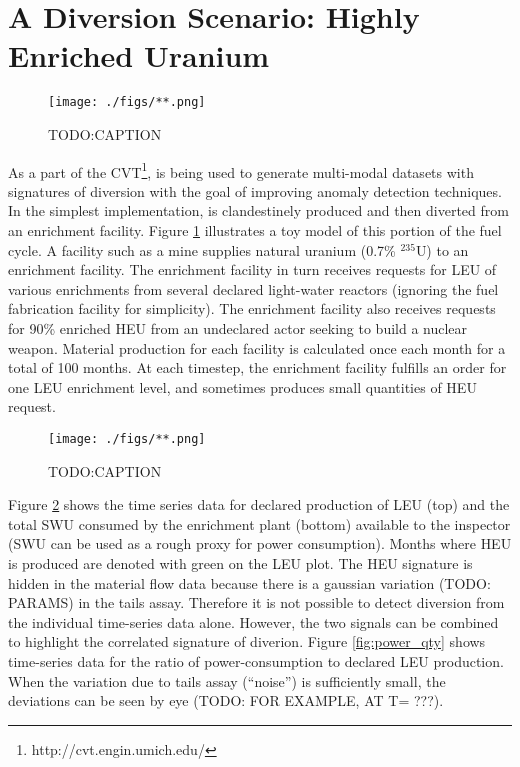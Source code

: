 \section{A Diversion Scenario: Highly Enriched Uranium}
\label{s_results}



\begin{figure}%
\begin{center}
\texttt{[image: ./figs/**.png]}
\end{center}
\caption{TODO:CAPTION}
\label{fig:scenario_layout}
\end{figure}


As a part of the \gls{CVT}\footnote{http://cvt.engin.umich.edu/}, \Cyclus is being used to generate multi-modal datasets with signatures of diversion with the goal of improving anomaly detection techniques. In the simplest implementation,  is clandestinely produced and then diverted from an enrichment facility.  Figure \ref{fig:scenario_layout} illustrates a toy model of this portion of the fuel cycle. A facility such as a mine supplies natural uranium (0.7\% $^{235}$U) to an enrichment facility. The enrichment facility in turn receives requests for \gls{LEU} of various enrichments from several declared light-water reactors (ignoring the fuel fabrication facility for simplicity).  The enrichment facility also receives requests for 90\% enriched \gls{HEU} from an undeclared actor seeking to build a nuclear weapon. Material production for each facility is calculated once each month for a total of 100 months. At each timestep, the enrichment facility fulfills an order for one \gls{LEU} enrichment level, and sometimes produces small quantities of \gls{HEU} request. 

\begin{figure}%
\begin{center}
\texttt{[image: ./figs/**.png]}
\end{center}
\caption{TODO:CAPTION}
\label{fig:time_series}
\end{figure}

Figure \ref{fig:time_series} shows the time series data for declared production of \gls{LEU} (top) and the total SWU consumed by the enrichment plant (bottom) available to the inspector (SWU can be used as a rough proxy for power consumption).  Months where \gls{HEU} is produced are denoted with green on the \gls{LEU} plot.  The \gls{HEU} signature is hidden in the material flow data because there is a gaussian variation (TODO: PARAMS) in the tails assay.  Therefore it is not possible to detect diversion from the individual time-series data alone. However, the two signals can be combined to highlight the correlated signature of diverion. Figure \ref{fig:power_qty} shows time-series data for the ratio of power-consumption to declared \gls{LEU} production.  When the variation due to tails assay (``noise'') is sufficiently small, the deviations can be seen by eye (TODO: FOR EXAMPLE, AT T= ???).

